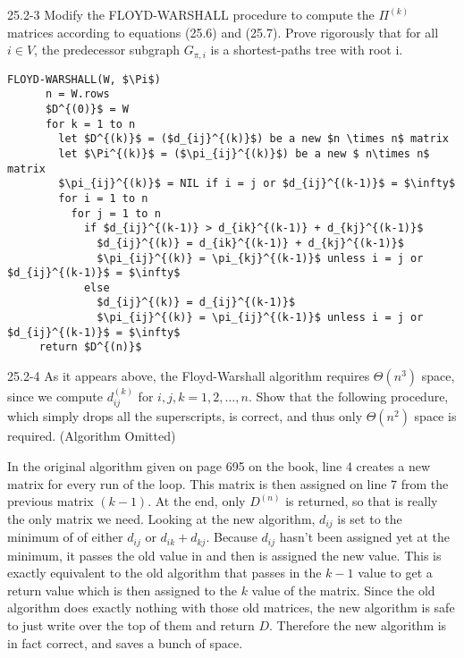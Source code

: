 \newpage
\begin{problem}{25.2-3}
  Modify the FLOYD-WARSHALL procedure to compute the $\Pi^{(k)}$ matrices according to equations (25.6) and (25.7).
  Prove rigorously that for all $i \in V$, the predecessor subgraph $G_{\pi,i}$ is a shortest-paths tree with root i.
  \begin{solution}
    \begin{lstlisting}[mathescape]
      FLOYD-WARSHALL(W, $\Pi$)
      n = W.rows
      $D^{(0)}$ = W
      for k = 1 to n
        let $D^{(k)}$ = ($d_{ij}^{(k)}$) be a new $n \times n$ matrix
        let $\Pi^{(k)}$ = ($\pi_{ij}^{(k)}$) be a new $ n\times n$ matrix
        $\pi_{ij}^{(k)}$ = NIL if i = j or $d_{ij}^{(k-1)}$ = $\infty$ 
        for i = 1 to n
          for j = 1 to n
            if $d_{ij}^{(k-1)} > d_{ik}^{(k-1)} + d_{kj}^{(k-1)}$
              $d_{ij}^{(k)} = d_{ik}^{(k-1)} + d_{kj}^{(k-1)}$
              $\pi_{ij}^{(k)} = \pi_{kj}^{(k-1)}$ unless i = j or $d_{ij}^{(k-1)}$ = $\infty$
            else
              $d_{ij}^{(k)} = d_{ij}^{(k-1)}$
              $\pi_{ij}^{(k)} = \pi_{ij}^{(k-1)}$ unless i = j or $d_{ij}^{(k-1)}$ = $\infty$
     return $D^{(n)}$
    \end{lstlisting}
  \end{solution}
\end{problem}

\begin{problem}{25.2-4}
  As it appears above, the Floyd-Warshall algorithm requires $\Theta(n^3)$ space, since we compute $d_{ij}^{(k)}$ for
  $i, j, k = 1, 2, \ldots, n$. Show that the following procedure, which simply drops all the superscripts, is correct,
  and thus only $\Theta(n^2)$ space is required.
  \br
  (Algorithm Omitted)
  \begin{solution}
    In the original algorithm given on page 695 on the book, line 4 creates a new matrix for every run of the loop.
    This matrix is then assigned on line 7 from the previous matrix $(k - 1)$.
    \br
    At the end, only $D^{(n)}$ is returned, so that is really the only matrix we need.
    \br
    Looking at the new algorithm, $d_{ij}$ is set to the minimum of of either $d_{ij}$ or $d_{ik} + d_{kj}$. Because 
    $d_{ij}$ hasn't been assigned yet at the minimum, it passes the old value in and then is assigned the new value.
    This is exactly equivalent to the old algorithm that passes in the $k - 1$ value to get a return value which is then
    assigned to the $k$ value of the matrix.
    \br
    Since the old algorithm does exactly nothing with those old matrices, the new algorithm is safe to just write over
    the top of them and return $D$.
    \br
    Therefore the new algorithm is in fact correct, and saves a bunch of space.
  \end{solution}
\end{problem}

